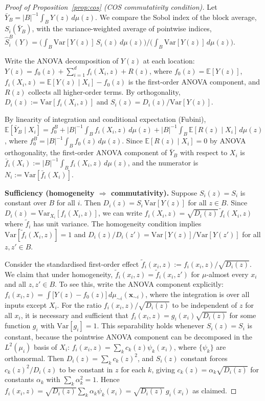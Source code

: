 \documentclass[11pt,onecolumn]{article}
\begin{document}
\begin{proof}[Proof of Proposition~\ref{prop:cos} (COS commutativity condition)]
Let $\bar{Y}_B = |B|^{-1} \int_B Y(z)\, d\mu(z)$.
We compare the Sobol index of the block average, $S_i(\bar{Y}_B)$, with the
variance-weighted average of pointwise indices,
$\hat{S}_i^B(Y) = \bigl(\int_B \mathrm{Var}[Y(z)]\,S_i(z)\,d\mu(z)\bigr)
/ \bigl(\int_B \mathrm{Var}[Y(z)]\,d\mu(z)\bigr)$.

Write the ANOVA decomposition of $Y(z)$ at each location:
$Y(z) = f_0(z) + \sum_{i=1}^d f_i(X_i, z) + R(z)$, where $f_0(z) = \mathbb{E}[Y(z)]$,
$f_i(X_i, z) = \mathbb{E}[Y(z)\mid X_i] - f_0(z)$ is the first-order ANOVA component,
and $R(z)$ collects all higher-order terms.
By orthogonality, $D_i(z) := \mathrm{Var}[f_i(X_i,z)]$ and
$S_i(z) = D_i(z)/\mathrm{Var}[Y(z)]$.

By linearity of integration and conditional expectation (Fubini),
$\mathbb{E}[\bar{Y}_B \mid X_i]
= f_0^B + |B|^{-1}\int_B f_i(X_i, z)\,d\mu(z) + |B|^{-1}\int_B \mathbb{E}[R(z)\mid X_i]\,d\mu(z)$,
where $f_0^B = |B|^{-1}\int_B f_0(z)\,d\mu(z)$.
Since $\mathbb{E}[R(z)\mid X_i] = 0$ by ANOVA orthogonality, the first-order
ANOVA component of $\bar{Y}_B$ with respect to $X_i$ is
$\bar{f}_i(X_i) := |B|^{-1}\int_B f_i(X_i, z)\,d\mu(z)$, and the numerator is
$N_i := \mathrm{Var}[\bar{f}_i(X_i)]$.

\textbf{Sufficiency (homogeneity $\Rightarrow$ commutativity).}\quad
Suppose $S_i(z) = S_i$ is constant over $B$ for all $i$.
Then $D_i(z) = S_i\,\mathrm{Var}[Y(z)]$ for all $z \in B$.
Since $D_i(z) = \mathrm{Var}_{X_i}[f_i(X_i, z)]$, we can write
$f_i(X_i, z) = \sqrt{D_i(z)}\,\tilde{f}_i(X_i, z)$ where
$\tilde{f}_i$ has unit variance.
The homogeneity condition implies
$\mathrm{Var}[\tilde{f}_i(X_i, z)] = 1$ and
$D_i(z)/D_i(z') = \mathrm{Var}[Y(z)]/\mathrm{Var}[Y(z')]$ for all $z, z' \in B$.

Consider the standardised first-order effect
$\tilde{f}_i(x_i, z) := f_i(x_i, z)/\sqrt{D_i(z)}$.
We claim that under homogeneity, $\tilde{f}_i(x_i, z) = \tilde{f}_i(x_i, z')$
for $\mu$-almost every $x_i$ and all $z, z' \in B$.  To see this, write the
ANOVA component explicitly:
$f_i(x_i, z) = \int \bigl[Y(z) - f_0(z)\bigr]\,d\mu_{\sim i}(\mathbf{x}_{\sim i})$,
where the integration is over all inputs except $X_i$.
For the ratio $f_i(x_i, z)/\sqrt{D_i(z)}$ to be independent of $z$ for all $x_i$,
it is necessary and sufficient that $f_i(x_i, z) = g_i(x_i)\sqrt{D_i(z)}$ for
some function $g_i$ with $\mathrm{Var}[g_i] = 1$.
This separability holds whenever $S_i(z) = S_i$ is constant, because the
pointwise ANOVA component can be decomposed in the $L^2(\mu_i)$ basis of $X_i$:
$f_i(x_i, z) = \sum_k c_k(z)\psi_k(x_i)$, where $\{\psi_k\}$ are orthonormal.
Then $D_i(z) = \sum_k c_k(z)^2$, and $S_i(z)$ constant forces
$c_k(z)^2/D_i(z)$ to be constant in $z$ for each $k$, giving
$c_k(z) = \alpha_k\sqrt{D_i(z)}$ for constants $\alpha_k$ with $\sum_k\alpha_k^2 = 1$.
Hence $f_i(x_i, z) = \sqrt{D_i(z)}\sum_k \alpha_k\psi_k(x_i) = \sqrt{D_i(z)}\,g_i(x_i)$
as claimed.


\end{proof}
\end{document}
